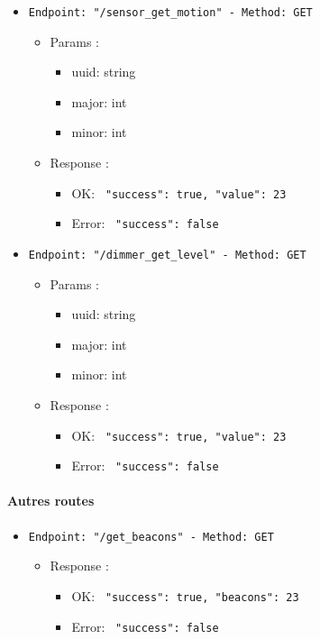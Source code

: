 \begin{itemize}
  \item \texttt{Endpoint: "/sensor_get_motion" -  Method: GET}
  \begin{itemize} 
    \item Params :
    \begin{itemize}
      \item uuid: string
      \item major: int
      \item minor: int
    \end{itemize}

    \item Response : 
    \begin{itemize}
      \item OK: \texttt{{ "success": true, "value": 23 }}
      \item Error: \texttt{{ "success": false }}
    \end{itemize}
  \end{itemize}
\end{itemize}

\begin{itemize}
  \item \texttt{Endpoint: "/dimmer_get_level" -  Method: GET}
  \begin{itemize} 
    \item Params :
    \begin{itemize}
      \item uuid: string
      \item major: int
      \item minor: int
    \end{itemize}

    \item Response : 
    \begin{itemize}
      \item OK: \texttt{{ "success": true, "value": 23 }}
      \item Error: \texttt{{ "success": false }}
    \end{itemize}
  \end{itemize}
\end{itemize}

\paragraph{Autres routes}

\begin{itemize}
  \item \texttt{Endpoint: "/get_beacons" -  Method: GET}
  \begin{itemize}
    \item Response : 
    \begin{itemize}
      \item OK: \texttt{{ "success": true, "beacons": 23 }}
      \item Error: \texttt{{ "success": false }}
    \end{itemize}
  \end{itemize}
\end{itemize}

